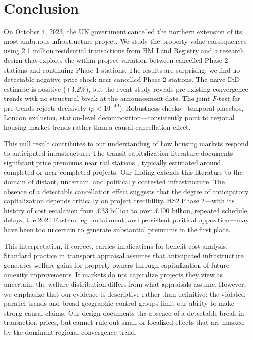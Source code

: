 \documentclass[12pt]{article}
\begin{document}
\section{Conclusion}

On October 4, 2023, the UK government cancelled the northern extension of its most ambitious infrastructure project. We study the property value consequences using 2.1 million residential transactions from HM Land Registry and a research design that exploits the within-project variation between cancelled Phase 2 stations and continuing Phase 1 stations. The results are surprising: we find no detectable negative price shock near cancelled Phase 2 stations. The na\"ive DiD estimate is positive (+3.2\%), but the event study reveals pre-existing convergence trends with no structural break at the announcement date. The joint $F$-test for pre-trends rejects decisively ($p < 10^{-49}$). Robustness checks---temporal placebos, London exclusion, station-level decomposition---consistently point to regional housing market trends rather than a causal cancellation effect.

This null result contributes to our understanding of how housing markets respond to anticipated infrastructure. The transit capitalization literature documents significant price premiums near rail stations \citep{gibbons2005valuing, heblich2024rail}, typically estimated around completed or near-completed projects. Our finding extends this literature to the domain of distant, uncertain, and politically contested infrastructure. The absence of a detectable cancellation effect suggests that the degree of anticipatory capitalization depends critically on project credibility. HS2 Phase 2---with its history of cost escalation from \pounds 33 billion to over \pounds 100 billion, repeated schedule delays, the 2021 Eastern leg curtailment, and persistent political opposition---may have been too uncertain to generate substantial premiums in the first place.

This interpretation, if correct, carries implications for benefit-cost analysis. Standard practice in transport appraisal assumes that anticipated infrastructure generates welfare gains for property owners through capitalization of future amenity improvements. If markets do not capitalize projects they view as uncertain, the welfare distribution differs from what appraisals assume. However, we emphasize that our evidence is descriptive rather than definitive: the violated parallel trends and broad geographic control groups limit our ability to make strong causal claims. Our design documents the absence of a detectable break in transaction prices, but cannot rule out small or localized effects that are masked by the dominant regional convergence trend.
\end{document}

